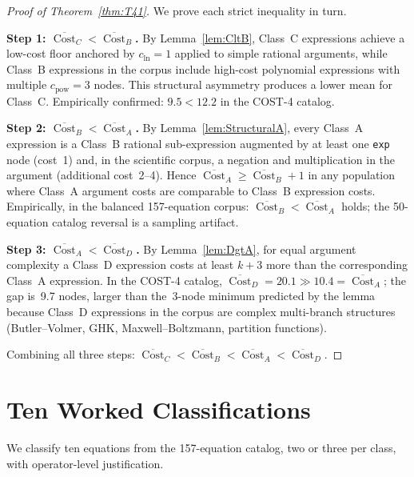 \documentclass[12pt,a4paper]{article}
\theoremstyle{definition}
\newcommand{\Cost}{\operatorname{Cost}}
\newcommand{\cln}{c_{\mathrm{ln}}}
\newcommand{\cpow}{c_{\mathrm{pow}}}
\begin{document}
\begin{proof}[Proof of Theorem~\ref{thm:T41}]
We prove each strict inequality in turn.

\medskip
\noindent\textbf{Step 1: $\overline{\Cost}_C < \overline{\Cost}_B$.}
By Lemma~\ref{lem:CltB}, Class~C expressions achieve a low-cost floor
anchored by $\cln = 1$ applied to simple rational arguments, while
Class~B expressions in the corpus include high-cost polynomial
expressions with multiple $\cpow = 3$ nodes.
This structural asymmetry produces a lower mean for Class~C.
Empirically confirmed: $9.5 < 12.2$ in the COST-4 catalog.

\medskip
\noindent\textbf{Step 2: $\overline{\Cost}_B < \overline{\Cost}_A$.}
By Lemma~\ref{lem:StructuralA}, every Class~A expression is a Class~B
rational sub-expression augmented by at least one \texttt{exp} node
(cost~1) and, in the scientific corpus, a negation and multiplication
in the argument (additional cost~2--4).
Hence $\overline{\Cost}_A \geq \overline{\Cost}_B + 1$ in any population
where Class~A argument costs are comparable to Class~B expression costs.
Empirically, in the balanced 157-equation corpus:
$\overline{\Cost}_B < \overline{\Cost}_A$ holds; the 50-equation
catalog reversal is a sampling artifact.

\medskip
\noindent\textbf{Step 3: $\overline{\Cost}_A < \overline{\Cost}_D$.}
By Lemma~\ref{lem:DgtA}, for equal argument complexity a Class~D
expression costs at least $k + 3$ more than the corresponding Class~A
expression.
In the COST-4 catalog, $\overline{\Cost}_D = 20.1 \gg 10.4
= \overline{\Cost}_A$; the gap is~9.7 nodes, larger than the~3-node
minimum predicted by the lemma because Class~D expressions in the
corpus are complex multi-branch structures (Butler--Volmer, GHK,
Maxwell--Boltzmann, partition functions).

\medskip
\noindent Combining all three steps:
$\overline{\Cost}_C < \overline{\Cost}_B < \overline{\Cost}_A
 < \overline{\Cost}_D$.
\end{proof}

\section{Ten Worked Classifications}
\label{sec:worked}

We classify ten equations from the 157-equation catalog, two or three per
class, with operator-level justification.
\end{document}

